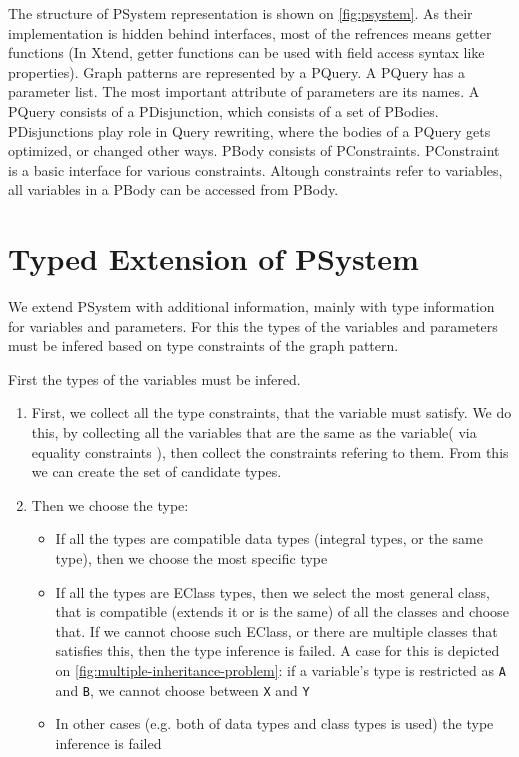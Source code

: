 The structure of PSystem representation is shown on \autoref{fig:psystem}. 
As their implementation is hidden behind interfaces, most of the refrences means getter functions (In Xtend, getter functions can be used with field access syntax like \csharp{} properties). 
Graph patterns are represented by a PQuery. 
A PQuery has a parameter list. 
The most important attribute of parameters are its names. 
A PQuery consists of a PDisjunction, which consists of a set of PBodies. 
PDisjunctions play role in Query rewriting, where the bodies of a PQuery gets optimized, or changed other ways.
PBody consists of PConstraints. 
PConstraint is a basic interface for various constraints. 
Altough constraints refer to variables, all variables in a PBody can be accessed from PBody.




\section{Typed Extension of PSystem}

We extend PSystem with additional information, mainly with type information for variables and parameters.
For this the types of the variables and parameters must be infered based on type constraints of the graph pattern.

First the types of the variables must be infered. 
\begin{enumerate}
	\item 
	First, we collect all the type constraints, that the variable must satisfy.
	We do this, by collecting all the variables that are the same as the variable( via equality constraints ), 
	then collect the constraints refering to them.
	From this we can create the set of candidate types.
	\item
	Then we choose the type:
	\begin{itemize}
		\item
		If all the types are compatible data types (integral types, or the same type), then we choose the most specific type
		\item
		If all the types are EClass types, then we select the most general class, that is compatible (extends it or is the same) of all the classes and choose that.
		If we cannot choose such EClass, or there are multiple classes that satisfies this, then the type inference is failed.
		A case for this is depicted on \autoref{fig:multiple-inheritance-problem}: if a variable's type is restricted as \texttt{A} and \texttt{B}, we cannot choose between \texttt{X} and \texttt{Y}
		\item
		In other cases (e.g. both of data types and class types is used) the type inference is failed
	\end{itemize}
\end{enumerate}


